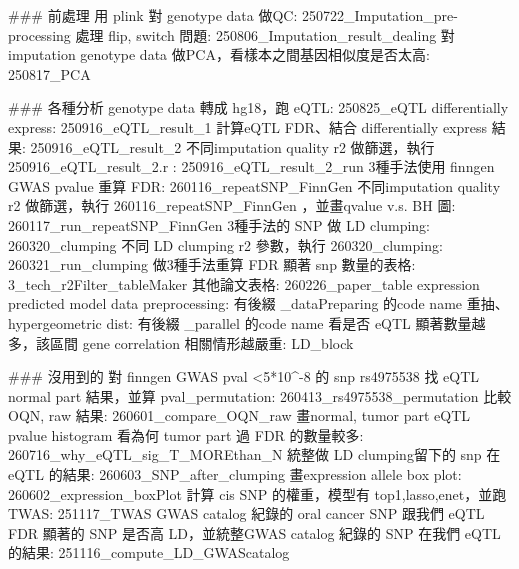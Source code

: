 ### 前處理
用 plink 對 genotype data 做QC: 250722_Imputation_pre-processing
處理 flip, switch 問題: 250806_Imputation_result_dealing
對imputation genotype data 做PCA，看樣本之間基因相似度是否太高: 250817_PCA



### 各種分析
genotype data 轉成 hg18，跑 eQTL: 250825_eQTL
differentially express: 250916_eQTL_result_1
計算eQTL FDR、結合 differentially express 結果: 250916_eQTL_result_2
不同imputation quality r2 做篩選，執行 250916_eQTL_result_2.r : 250916_eQTL_result_2_run
3種手法使用 finngen GWAS pvalue 重算 FDR: 260116_repeatSNP_FinnGen
不同imputation quality r2 做篩選，執行 260116_repeatSNP_FinnGen ，並畫qvalue v.s. BH 圖: 260117_run_repeatSNP_FinnGen
3種手法的 SNP 做 LD clumping: 260320_clumping
不同 LD clumping r2 參數，執行 260320_clumping: 260321_run_clumping
做3種手法重算 FDR 顯著 snp 數量的表格: 3_tech_r2Filter_tableMaker
其他論文表格: 260226_paper_table
expression predicted model data preprocessing: 有後綴 _dataPreparing 的code name
重抽、hypergeometric dist: 有後綴 _parallel 的code name
看是否 eQTL 顯著數量越多，該區間 gene correlation 相關情形越嚴重: LD_block



### 沒用到的
對 finngen GWAS pval <5*10^-8 的 snp rs4975538 找 eQTL normal part 結果，並算 pval_permutation: 260413_rs4975538_permutation
比較 OQN, raw 結果: 260601_compare_OQN_raw
畫normal, tumor part eQTL pvalue histogram 看為何 tumor part 過 FDR 的數量較多: 260716_why_eQTL_sig_T_MOREthan_N
統整做 LD clumping留下的 snp 在 eQTL 的結果: 260603_SNP_after_clumping
畫expression allele box plot: 260602_expression_boxPlot
計算 cis SNP 的權重，模型有 top1,lasso,enet，並跑 TWAS: 251117_TWAS
GWAS catalog 紀錄的 oral cancer SNP 跟我們 eQTL FDR 顯著的 SNP 是否高 LD，並統整GWAS catalog 紀錄的 SNP 在我們 eQTL 的結果: 251116_compute_LD_GWAScatalog


